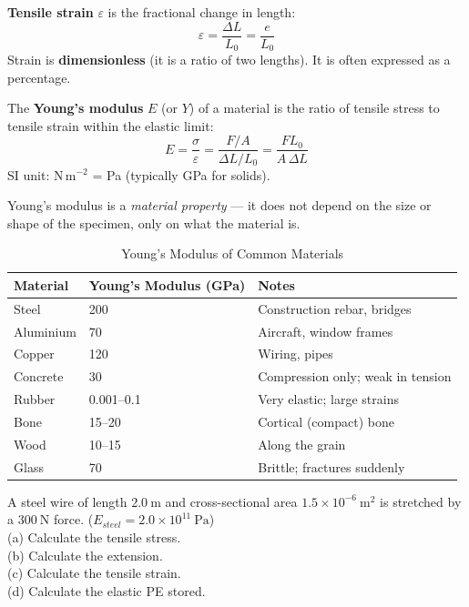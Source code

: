 \begin{definitionbox}
\textbf{Tensile strain} $\varepsilon$ is the fractional
change in length:
\[
  \varepsilon = \frac{\Delta L}{L_0}
  = \frac{e}{L_0}
\]
Strain is \textbf{dimensionless} (it is a ratio of
two lengths). It is often expressed as a percentage.
\end{definitionbox}

\begin{definitionbox}
The \textbf{Young's modulus} $E$ (or $Y$) of a material
is the ratio of tensile stress to tensile strain within
the elastic limit:
\[
  E = \frac{\sigma}{\varepsilon}
  = \frac{F/A}{\Delta L/L_0}
  = \frac{FL_0}{A\,\Delta L}
\]
SI unit: N\,m$^{-2}$ = Pa (typically GPa for solids).

Young's modulus is a \textit{material property} ---
it does not depend on the size or shape of the
specimen, only on what the material is.
\end{definitionbox}

\begin{table}[H]
\centering
\caption{Young's Modulus of Common Materials}
\label{tab:youngs_modulus}
\begin{tabular}{lll}
\toprule
\textbf{Material} & \textbf{Young's Modulus (GPa)} &
\textbf{Notes}\\
\midrule
Steel & 200 & Construction rebar, bridges\\
Aluminium & 70 & Aircraft, window frames\\
Copper & 120 & Wiring, pipes\\
Concrete & 30 & Compression only; weak in tension\\
Rubber & 0.001--0.1 & Very elastic; large strains\\
Bone & 15--20 & Cortical (compact) bone\\
Wood & 10--15 & Along the grain\\
Glass & 70 & Brittle; fractures suddenly\\
\bottomrule
\end{tabular}
\end{table}

\begin{examplebox}[9.3]
A steel wire of length $2.0\ \text{m}$ and
cross-sectional area $1.5\times10^{-6}\ \text{m}^2$
is stretched by a $300\ \text{N}$ force.
($E_{steel} = 2.0\times10^{11}\ \text{Pa}$)\\
(a) Calculate the tensile stress.\\
(b) Calculate the extension.\\
(c) Calculate the tensile strain.\\
(d) Calculate the elastic PE stored.
\end{examplebox}


